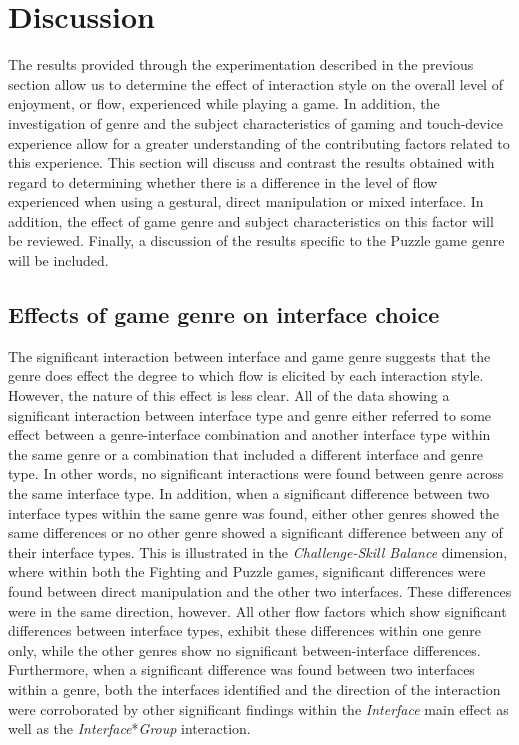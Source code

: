 \section{Discussion}
The results provided through the experimentation described in the previous section allow us to determine the effect of interaction style on the overall level of enjoyment, or flow, experienced while playing a game. In addition, the investigation of genre and the subject characteristics of gaming and touch-device experience allow for a greater understanding of the contributing factors related to this experience. This section will discuss and contrast the results obtained with regard to determining whether there is a difference in the level of flow experienced when using a gestural, direct manipulation or mixed interface. In addition, the effect of game genre and subject characteristics on this factor will be reviewed. Finally, a discussion of the results specific to the Puzzle game genre will be included.

\subsection{Effects of game genre on interface choice}
The significant interaction between interface and game genre suggests that the genre does effect the degree to which flow is elicited by each interaction style. However, the nature of this effect is less clear. All of the data showing a significant interaction between interface type and genre either referred to some effect between a genre-interface combination and another interface type within the same genre or a combination that included a different interface and genre type. In other words, no significant interactions were found between genre across the same interface type. In addition, when a significant difference between two interface types within the same genre was found, either other genres showed the same differences or no other genre showed a significant difference between any of their interface types. This is illustrated in the \emph{Challenge-Skill Balance} dimension, where within both the Fighting and Puzzle games, significant differences were found between direct manipulation and the other two interfaces. These differences were in the same direction, however. All other flow factors which show significant differences between interface types, exhibit these differences within one genre only, while the other genres show no significant between-interface differences. Furthermore, when a significant difference was found between two interfaces within a genre, both the interfaces identified and the direction of the interaction were corroborated by other significant findings within the \emph{Interface} main effect as well as the \emph{Interface}*\emph{Group} interaction.


